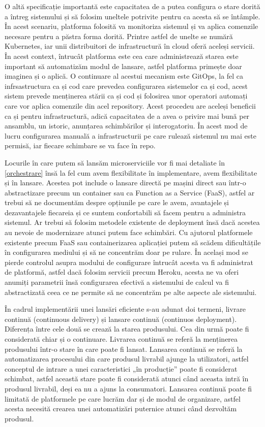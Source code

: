 O altă specificație importantă este capacitatea de a putea configura o stare dorită a întreg 
sistemului și să folosim uneltele potrivite pentru ca acesta să se întâmple. În acest
scenariu, platforma folosită va monitoriza sistemul și va aplica comenzile necesare pentru
a păstra forma dorită. Printre astfel de unelte se numără Kubernetes, iar unii distribuitori
de infrastructură în cloud oferă aceleși servicii. În acest context, întrucât platforma este 
cea care administrează starea este important să automatizăm modul de lansare, astfel platforma
primește doar imaginea și o aplică. O continuare al acestui mecanism este GitOps, la fel ca
infrsastructura ca și cod care prevedea configurarea sistemelor ca și cod, acest sistem
prevede menținerea stării ca și cod și folosirea unor operatori automați care vor aplica
comenzile din acel repository. Acest procedeu are aceleși beneficii ca și pentru infrastructură, 
adică capacitatea de a avea o privire mai bună per ansamblu, un istoric, anunțarea schimbărilor
și interogatoriu. În acest mod de lucru configurarea manuală a infrastructurii pe care 
rulează sistemul nu mai este permisă, iar fiecare schimbare se va face în repo.

Locurile în care putem să lansăm microserviciile vor fi mai detaliate în \autoref{orchestrare} %
însă la fel cum avem flexibilitate în implementare, avem flexibilitate și în lansare. Acestea 
pot include o lansare directă pe mașini direct sau într-o abstractizare precum un container sau ca
Function as a Service (FaaS), astfel ar trebui să ne documentăm despre opțiunile pe care le avem,
avantajele și dezavantajele fiecareia și ce suntem confortabili să facem pentru a administra sistemul.
Ar trebui să folosim metodele existente de deployment însă dacă acestea au nevoie de modernizare
atunci putem face schimbări. Cu ajutorul platformele existente precum FaaS sau containerizarea
aplicației putem să scădem dificultățile în configurarea mediului și să ne concentrăm doar pe
rulare. În același mod se pierde controlul asupra modului de configurare întrucât 
acesta va fi administrat de platformă, astfel dacă folosim servicii precum Heroku, acesta ne va oferi
anumiți parametrii însă configurarea efectivă a sistemului de calcul va fi abstractizată ceea ce ne
permite să ne concentrăm pe alte aspecte ale sistemului. 

În cadrul implementării unei lansări eficiente s-au adunat doi termeni, livrare continuă
(continuous delivery) și lansare continuă (continuos deployment). Diferența între cele două
se crează la starea produsului. Cea din urmă poate fi considerată chiar și o continuare.
Livrarea continuă se referă la menținerea produsului într-o stare în care poate fi lansat.
Lansarea continuă se referă la automatizarea procesului din care produsul livrabil ajunge
la utilizatori, astfel conceptul de intrare a unei caracteristici „în producție” poate fi considerat
schimbat, astfel această stare poate fi considerată atunci când aceasta intră în produsul livrabil,
deși ea nu a ajuns la consumatori. Lansarea continuă poate fi limitată de platformele pe care 
lucrăm dar și de modul de organizare, astfel acesta necesită crearea unei automatizări 
puternice atunci când dezvoltăm produsul.
